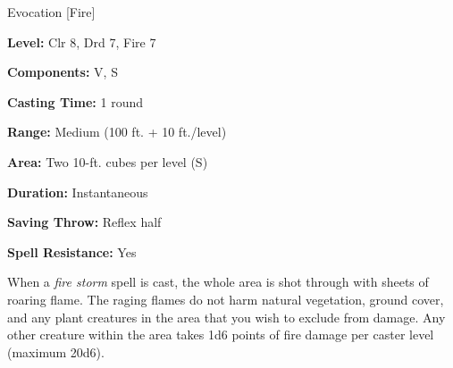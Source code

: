
Evocation [Fire]

\textbf{Level:} Clr 8, Drd 7, Fire 7

\textbf{Components:} V, S

\textbf{Casting Time:} 1 round

\textbf{Range:} Medium (100 ft. + 10 ft./level)

\textbf{Area:} Two 10-ft. cubes per level (S)

\textbf{Duration:} Instantaneous

\textbf{Saving Throw:} Reflex half

\textbf{Spell Resistance:} Yes

When a \textit{fire storm} spell is cast, the whole area is shot through with sheets 
of roaring flame. The raging flames do not harm natural vegetation, ground cover, 
and any plant creatures in the area that you wish to exclude from damage. Any other 
creature within the area takes 1d6 points of fire damage per caster level (maximum 
20d6).

